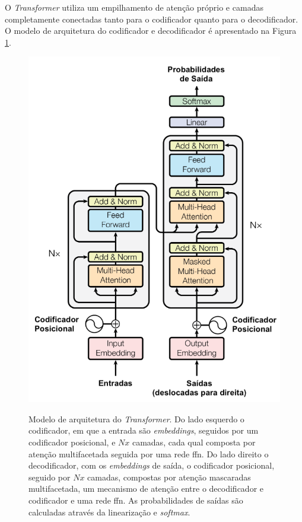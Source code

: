 O \textit{Transformer} utiliza um empilhamento de atenção próprio e camadas completamente conectadas tanto para o codificador quanto para o decodificador. O modelo de arquitetura do codificador e decodificador é apresentado na Figura \ref{fig:transformer-arquitetura}.
\begin{figure}[htbp]
    \centering
        \caption[Modelo de arquitetura do \textit{Transformer}.]{Modelo de arquitetura do \textit{Transformer}. Do lado esquerdo o codificador, em que a entrada são \textit{embeddings}, seguidos por um codificador posicional, e $Nx$ camadas, cada qual composta por atenção multifacetada seguida por uma rede \gls{ffn}. Do lado direito o decodificador, com os \textit{embeddings} de saída, o codificador posicional, seguido por $Nx$ camadas, compostas por atenção mascaradas multifacetada, um mecanismo de atenção entre o decodificador e codificador e uma rede \gls{ffn}. As probabilidades de saídas são calculadas através da linearização e \textit{softmax}.}
        \includegraphics[scale=0.85]{resources/images/pln/transformer.png}
        \label{fig:transformer-arquitetura}
\end{figure}

